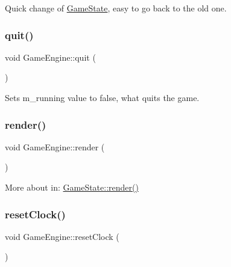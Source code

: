 Quick change of \mbox{\hyperlink{class_game_state}{Game\+State}}, easy to go back to the old one. 

\mbox{\label{class_game_engine_ad82b626def2e52b28f0d6c2d167589f6}} 
\subsubsection{\texorpdfstring{quit()}{quit()}}
{\footnotesize\ttfamily void Game\+Engine\+::quit (\begin{DoxyParamCaption}{ }\end{DoxyParamCaption})\hspace{0.3cm}{\ttfamily [inline]}}



Sets m\+\_\+running value to false, what quits the game. 

\mbox{\label{class_game_engine_a267bf9164ba09e32b7a24ba4afb527d4}} 
\subsubsection{\texorpdfstring{render()}{render()}}
{\footnotesize\ttfamily void Game\+Engine\+::render (\begin{DoxyParamCaption}{ }\end{DoxyParamCaption})}



More about in\+: \mbox{\hyperlink{class_game_state_a0d56cd5355f59a87cf95e1c6d719f329}{Game\+State\+::render()}} 

\mbox{\label{class_game_engine_a0f906c0e3c093e66abf1d387767d2a24}} 
\subsubsection{\texorpdfstring{resetClock()}{resetClock()}}
{\footnotesize\ttfamily void Game\+Engine\+::reset\+Clock (\begin{DoxyParamCaption}{ }\end{DoxyParamCaption})\hspace{0.3cm}{\ttfamily [inline]}}



